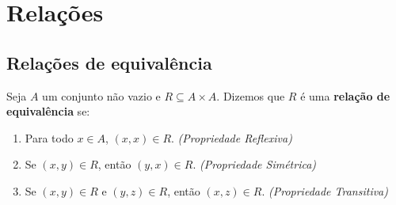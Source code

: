 \chapter{Relações}



\section{Relações de equivalência}

\begin{definicao}\label{definicao_relacao_equivalencia}
    Seja $A$ um conjunto não vazio e $R\subseteq A \times A$. Dizemos que $R$ é uma \textbf{relação de equivalência} se:
    \begin{enumerate}[label={\roman*})]
        \item Para todo $x \in A$, $(x,x) \in R$. \textit{(Propriedade Reflexiva)}
        \item Se $(x, y) \in R$, então $(y, x) \in R$. \textit{(Propriedade Simétrica)}
        \item Se $(x, y) \in R$ e $(y, z) \in R$, então $(x, z)\in R$. \textit{(Propriedade Transitiva)}
    \end{enumerate}
\end{definicao}

